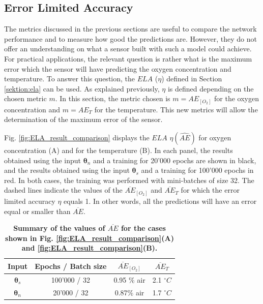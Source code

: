 \documentclass[final,5p,times,twocolumn]{elsarticle}
\begin{document}
\subsection{Error Limited Accuracy}

The metrics discussed in the previous sections are useful to compare the network performance and to measure how good the predictions are. However, they do not offer an understanding on what a sensor built with such a model could achieve. For practical applications, the relevant question is rather what is the maximum error which the sensor will have predicting the oxygen concentration and temperature. To answer this question, the $ELA$ ($\eta$) defined in Section \ref{sektion:ela} can be used. As explained previously, $\eta$ is defined depending on the chosen metric $m$. In this section, the metric chosen is $m=AE_{[O_2]}$ for the oxygen concentration and $m=AE_{T}$ for the temperature. This new metrics will allow the determination of the maximum error of the sensor. 

Fig. \ref{fig:ELA_result_comparison} displays the $ELA$ $\eta(\widehat {AE})$ for oxygen concentration (A) and for the temperature (B). In each panel, the results obtained using the input ${\pmb \theta}_n$ and a training for 20'000 epochs are shown in black, and the results obtained using the input ${\pmb \theta}_s$ and a training for 100'000 epochs in red. In both cases, the training was performed with mini-batches of size 32.
The dashed lines indicate the values of the $\overline{AE}_{[O_2]}$ and $\overline{AE}_{T}$ for which the error limited accuracy $\eta$ equals 1. In other words, all the predictions will have an error equal or smaller than $\overline{AE}$.

\begin{table}[t!]
\centering
\caption {\bf Summary of the values of $\overline{AE}$ for the cases shown in Fig. \ref{fig:ELA_result_comparison}(A) and \ref{fig:ELA_result_comparison}(B).}
\begin{tabular}{ cccc}
\smallskip 
 Input & Epochs / Batch size & $\overline{AE}_{[O_2]}$ & $\overline{AE}_{T}$  \\ 
 \hline
${\pmb \theta}_s$ & 100'000 / 32 & 0.95 \% air & 2.1 $^\circ C$\\ 
${\pmb \theta}_n $ & 20'000 / 32 & 0.87\% air & 1.7 $^\circ C$\\ 
\end{tabular}
\label{table:ela}
\end{table}
\end{document}
